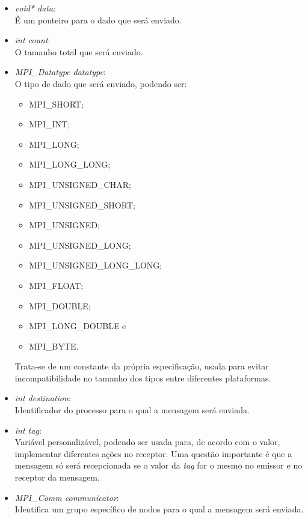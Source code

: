 			\begin{itemize}
				\item \textit{void* data}:\\
					É um ponteiro para o dado que será enviado.
				
				\item \textit{int count}:\\
					O tamanho total que será enviado.
					
				\item \textit{MPI\_Datatype datatype}:\\
					O tipo de dado que será enviado, podendo ser:
					\begin{itemize}
						\item MPI\_SHORT;
						\item MPI\_INT;
						\item MPI\_LONG;
						\item MPI\_LONG\_LONG;
						\item MPI\_UNSIGNED\_CHAR;
						\item MPI\_UNSIGNED\_SHORT;
						\item MPI\_UNSIGNED;
						\item MPI\_UNSIGNED\_LONG;
						\item MPI\_UNSIGNED\_LONG\_LONG;
						\item MPI\_FLOAT;
						\item MPI\_DOUBLE;
						\item MPI\_LONG\_DOUBLE e
						\item MPI\_BYTE.
					\end{itemize}
					Trata-se de um constante da própria especificação, usada para evitar incompatibilidade no tamanho dos tipos entre diferentes plataformas.
					
				\item \textit{int destination}:\\
					Identificador do processo para o qual a mensagem será enviada.
										
				\item \textit{int tag}:\\
					Variável personalizável, podendo ser usada para, de acordo com o valor, implementar diferentes ações no receptor. Uma questão importante é que a mensagem só será recepcionada se o valor da \textit{tag} for o mesmo no emissor e no receptor da mensagem.
					
				\item \textit{MPI\_Comm communicator}:\\
							Identifica um grupo específico de nodos para o qual a mensagem será enviada.	
			\end{itemize}
			

